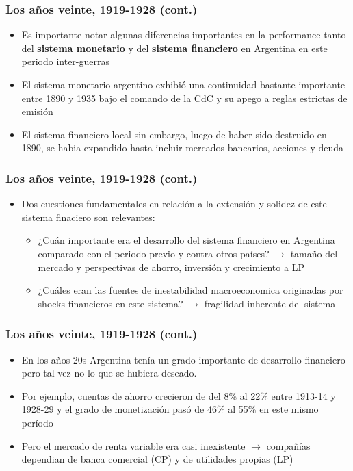 \documentclass[14pt,aspectratio=169]{beamer}
\begin{document}
\begin{frame}\frametitle{Los años veinte, 1919-1928 (cont.)}
    \begin{itemize}\itemsep 10pt
      \item Es importante notar algunas diferencias importantes en la
        performance tanto del \textbf{sistema monetario} y del
        \textbf{sistema financiero} en Argentina en este periodo
        inter-guerras
        \item El sistema monetario argentino exhibió una continuidad
          bastante importante entre 1890 y 1935 bajo el comando de la
          CdC y su apego a reglas estrictas de emisión
          \item El sistema financiero local sin embargo, luego de
            haber sido destruido en 1890, se habia expandido hasta
            incluir mercados bancarios, acciones y deuda
       \end{itemize}
      \end{frame}
  

\begin{frame}\frametitle{Los años veinte, 1919-1928 (cont.)}
    \begin{itemize}\itemsep 10pt
      \item Dos cuestiones fundamentales en relación a la extensión y
        solidez de este sistema finaciero son relevantes:
        \begin{itemize}\itemsep 10pt \medskip
        \item ¿Cuán importante era el desarrollo del sistema
          financiero en Argentina comparado con el periodo previo y
          contra otros países? $\longrightarrow$ tamaño del mercado y
          perspectivas de ahorro, inversión y crecimiento a LP
          \item ¿Cuáles eran las fuentes de inestabilidad
            macroeconomica originadas por shocks financieros en este
            sistema? $\longrightarrow$ fragilidad inherente del sistema
          \end{itemize}
       \end{itemize}
      \end{frame}

      


\begin{frame}\frametitle{Los años veinte, 1919-1928 (cont.)}
    \begin{itemize}\itemsep 10pt
      \item En los años 20s Argentina tenía un grado importante de
        desarrollo financiero pero tal vez no lo que se hubiera
        deseado.
        \item Por ejemplo, cuentas de ahorro crecieron de del 8\% al
          22\% entre 1913-14 y 1928-29 y el grado de monetización
          pasó de 46\% al 55\% en este mismo período
          \item Pero el mercado de renta variable era casi
            inexistente $\longrightarrow$ compañías dependian de
            banca comercial (CP) y de utilidades propias (LP) 
       \end{itemize}
      \end{frame}
  
\end{document}
